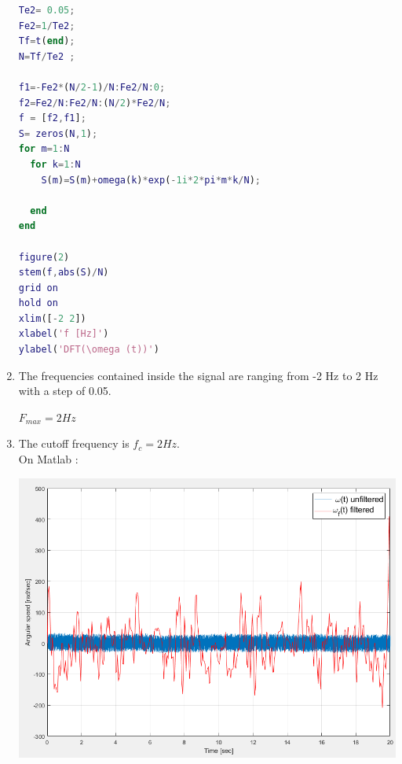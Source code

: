 \documentclass[a4paper,12pt]{article}
\begin{document}
\begin{enumerate}[label={\color{blue}\arabic*)}]
\begin{multicols}{2}
    \begin{lstlisting}[style=Matlab-editor,language=Matlab, basicstyle=\small\ttfamily]
% Plot of the DFT of omega(t)
Te2= 0.05;
Fe2=1/Te2;
Tf=t(end);
N=Tf/Te2 ;

f1=-Fe2*(N/2-1)/N:Fe2/N:0;
f2=Fe2/N:Fe2/N:(N/2)*Fe2/N;
f = [f2,f1];
S= zeros(N,1);
for m=1:N
  for k=1:N
    S(m)=S(m)+omega(k)*exp(-1i*2*pi*m*k/N);

  end
end

figure(2)
stem(f,abs(S)/N)
grid on
hold on
xlim([-2 2])
xlabel('f [Hz]')
ylabel('DFT(\omega (t))')
        \end{lstlisting}

    \end{multicols}

    \item
    The frequencies contained inside the signal are ranging from -2 Hz to 2 Hz with a step of 0.05.

    \(F_{max} = 2 Hz\)
    \newpage

    \item
    The cutoff frequency is \(f_c = 2 Hz\). \\
    On Matlab :
    \begin{multicols}{2}

        \begin{flushleft}
            \includegraphics[scale=0.32]{Images/Omega_Filtered.png}
            \label{Figure3}
        \end{flushleft}

    \columnbreak


\end{multicols}
\end{enumerate}
\end{document}
